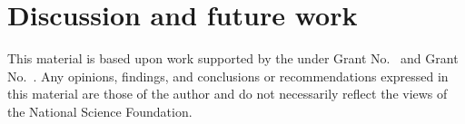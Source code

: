 \documentclass[acmlarge,anonymous]{acmart}\settopmatter{printfolios=true}
\begin{document}


\section{Discussion and future work}\label{sec-discussion}



\begin{acks}                            %
  This material is based upon work supported by the
   under Grant
  No.~ and Grant
  No.~.  Any opinions, findings, and
  conclusions or recommendations expressed in this material are those
  of the author and do not necessarily reflect the views of the
  National Science Foundation.
\end{acks}




\end{document}

